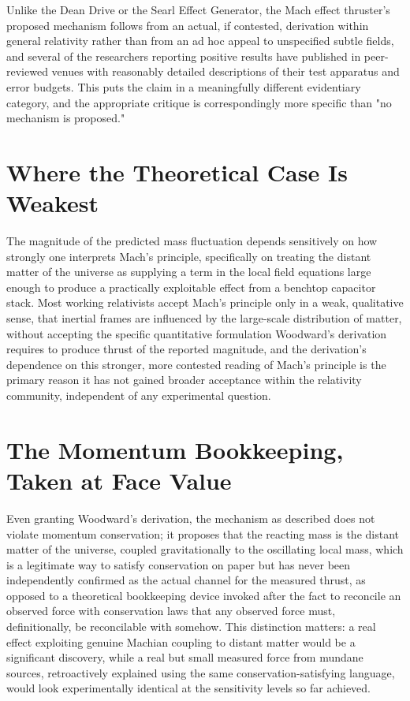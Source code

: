 \documentclass[11pt]{article}
\begin{document}
Unlike the Dean Drive or the Searl Effect Generator, the Mach effect thruster's proposed mechanism follows from an actual, if contested, derivation within general relativity rather than from an ad hoc appeal to unspecified subtle fields, and several of the researchers reporting positive results have published in peer-reviewed venues with reasonably detailed descriptions of their test apparatus and error budgets. This puts the claim in a meaningfully different evidentiary category, and the appropriate critique is correspondingly more specific than "no mechanism is proposed."

\section{Where the Theoretical Case Is Weakest}

The magnitude of the predicted mass fluctuation depends sensitively on how strongly one interprets Mach's principle, specifically on treating the distant matter of the universe as supplying a term in the local field equations large enough to produce a practically exploitable effect from a benchtop capacitor stack. Most working relativists accept Mach's principle only in a weak, qualitative sense, that inertial frames are influenced by the large-scale distribution of matter, without accepting the specific quantitative formulation Woodward's derivation requires to produce thrust of the reported magnitude, and the derivation's dependence on this stronger, more contested reading of Mach's principle is the primary reason it has not gained broader acceptance within the relativity community, independent of any experimental question.

\section{The Momentum Bookkeeping, Taken at Face Value}

Even granting Woodward's derivation, the mechanism as described does not violate momentum conservation; it proposes that the reacting mass is the distant matter of the universe, coupled gravitationally to the oscillating local mass, which is a legitimate way to satisfy conservation on paper but has never been independently confirmed as the actual channel for the measured thrust, as opposed to a theoretical bookkeeping device invoked after the fact to reconcile an observed force with conservation laws that any observed force must, definitionally, be reconcilable with somehow. This distinction matters: a real effect exploiting genuine Machian coupling to distant matter would be a significant discovery, while a real but small measured force from mundane sources, retroactively explained using the same conservation-satisfying language, would look experimentally identical at the sensitivity levels so far achieved.
\end{document}
